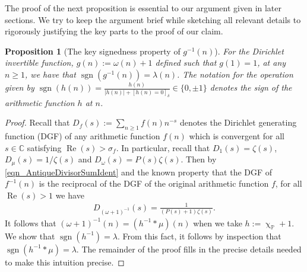 \documentclass[11pt,reqno,a4letter]{article}
\numberwithin{figure}{section}
\numberwithin{table}{section}
\newcommand{\Iverson}[1]{\ensuremath{\left[#1\right]_{\delta}}}
\renewcommand{\chi}{\upchi}
\theoremstyle{plain}
\newtheorem{prop}[theorem]{Proposition}
\numberwithin{theorem}{section}
\theoremstyle{definition}
\newcommand{\NBRef}[1]{}
\renewcommand{\Re}{\operatorname{Re}}
\begin{document}
The proof of the next proposition is essential to our argument given in later sections. 
We try to keep the argument brief while sketching all relevant details to rigorously justifying the key parts 
to the proof of our claim. 

\begin{prop}[The key signedness property of $g^{-1}(n)$]
\label{prop_SignageDirInvsOfPosBddArithmeticFuncs_v1} 
For the Dirichlet invertible function, $g(n) := \omega(n) + 1$ defined such that $g(1) = 1$, at any 
$n \geq 1$, we have that $\operatorname{sgn}(g^{-1}(n)) = \lambda(n)$. 
The notation for the operation given by 
$\operatorname{sgn}(h(n)) = \frac{h(n)}{|h(n)| + \Iverson{h(n) = 0}} \in \{0, \pm 1\}$ denotes the sign 
of the arithmetic function $h$ at $n$. 
\NBRef{A02-2020-04-26}
\end{prop} 
\begin{proof} 
Recall that $D_f(s) := \sum_{n \geq 1} f(n) n^{-s}$ denotes the Dirichlet generating function (DGF) of any 
arithmetic function $f(n)$ which is convergent for all $s \in \mathbb{C}$ satisfying $\Re(s) > \sigma_f$. 
In particular, recall that $D_1(s) = \zeta(s)$, $D_{\mu}(s) = 1 / \zeta(s)$ and $D_{\omega}(s) = P(s) \zeta(s)$. 
Then by \eqref{eqn_AntiqueDivisorSumIdent} and the known property that the DGF of $f^{-1}(n)$ is 
the reciprocal of the DGF of the original arithmetic function $f$, for all $\Re(s) > 1$ we have 
\begin{align} 
\label{eqn_DGF_of_gInvn} 
D_{(\omega+1)^{-1}}(s) = \frac{1}{(P(s)+1) \zeta(s)}. 
\end{align} 
It follows that $(\omega + 1)^{-1}(n) = (h^{-1} \ast \mu)(n)$ when we take 
$h := \chi_{\mathbb{P}} + 1$. 
We show that $\operatorname{sgn}(h^{-1}) = \lambda$. From this fact, it follows by inspection 
that $\operatorname{sgn}(h^{-1} \ast \mu) = \lambda$. The remainder of the proof fills in the 
precise details needed to make this intuition precise. 


\end{proof}
\end{document}
